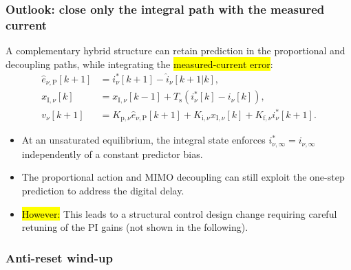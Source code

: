 \begin{frame}
    \frametitle{Outlook: close only the integral path with the measured current}
    A complementary hybrid structure can retain prediction in the proportional and decoupling paths, while integrating the \hl{measured-current error}:
    \begin{align}
        \hat{e}_{\nu,\mathrm{P}}[k+1]
         & =i_\nu^{*}[k+1]-\hat{i}_\nu[k+1|k],                                      \\
        x_{\mathrm{I},\nu}[k]
         & =x_{\mathrm{I},\nu}[k-1]+T_\mathrm{s}\left(i_\nu^{*}[k]-i_\nu[k]\right), \\
        v_\nu[k+1]
         & =K_{\mathrm{p},\nu}\hat{e}_{\nu,\mathrm{P}}[k+1]
        +K_{\mathrm{i},\nu}x_{\mathrm{I},\nu}[k]
        +K_{\mathrm{f},\nu}i_\nu^{*}[k+1].
    \end{align}\pause%
    \begin{itemize}
        \item At an unsaturated equilibrium, the integral state enforces $i_{\nu,\infty}^{*}=i_{\nu,\infty}$ independently of a constant predictor bias.\pause%
        \item The proportional action and MIMO decoupling can still exploit the one-step prediction to address the digital delay.\pause%
        \item \hl{However:} This leads to a structural control design change requiring careful retuning of the PI gains (not shown in the following).
    \end{itemize}
\end{frame}



\subsubsection{Anti-reset wind-up}

